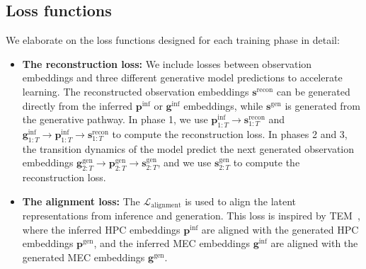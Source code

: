 \subsection{Loss functions}
\label{appendix:loss_function}
We elaborate on the loss functions designed for each training phase in detail:
\begin{itemize}
    \item \textbf{The reconstruction loss:} We include losses between observation embeddings and three different generative model predictions to accelerate learning. The reconstructed observation embeddings $\boldsymbol{s}^{\text{recon}}$ can be generated directly from the inferred $\boldsymbol{p}^{\text{inf}}$ or $\boldsymbol{g}^{\text{inf}}$ embeddings, while $\boldsymbol{s}^{\text{gen}}$ is generated from the generative pathway. 
    In phase 1, we use $\boldsymbol{p}_{1:T}^{\text{inf}} \rightarrow \boldsymbol{s}_{1:T}^{\text{recon}}$ and $\boldsymbol{g}_{1:T}^{\text{inf}} \rightarrow \boldsymbol{p}_{1:T}^{\text{inf}} \rightarrow \boldsymbol{s}_{1:T}^{\text{recon}}$ to compute the reconstruction loss. In phases 2 and 3, the transition dynamics of the model predict the next generated observation embeddings $\boldsymbol{g}_{2:T}^{\text{gen}} \rightarrow \boldsymbol{p}_{2:T}^{\text{gen}} \rightarrow \boldsymbol{s}_{2:T}^{\text{gen}}$, and we use $\boldsymbol{s}_{2:T}^{\text{gen}}$ to compute the reconstruction loss.
    
    \item \textbf{The alignment loss:} The $\mathcal{L}_{\text{alignment}}$ is used to align the latent representations from inference and generation. This loss is inspired by TEM~\citep{TolmanEichenbaumMachineUnifying2020}, where the inferred HPC embeddings $\boldsymbol{p}^{\text{inf}}$ are aligned with the generated HPC embeddings $\boldsymbol{p}^{\text{gen}}$, and the inferred MEC embeddings $\boldsymbol{g}^{\text{inf}}$ are aligned with the generated MEC embeddings $\boldsymbol{g}^{\text{gen}}$.
    

\end{itemize}
